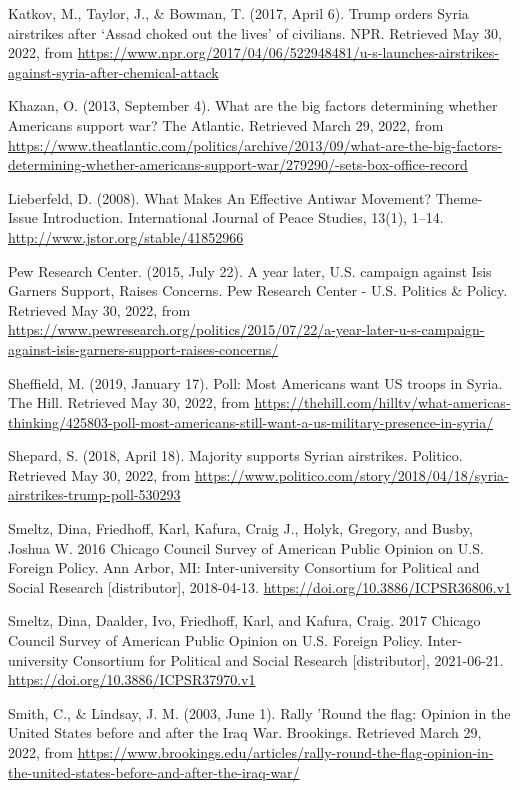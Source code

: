 \documentclass[
  11pt,
]{article}
\begin{document}
Katkov, M., Taylor, J., \& Bowman, T. (2017, April 6). Trump orders
Syria airstrikes after `Assad choked out the lives' of civilians. NPR.
Retrieved May 30, 2022, from
\url{https://www.npr.org/2017/04/06/522948481/u-s-launches-airstrikes-against-syria-after-chemical-attack}

Khazan, O. (2013, September 4). What are the big factors determining
whether Americans support war? The Atlantic. Retrieved March 29, 2022,
from
\url{https://www.theatlantic.com/politics/archive/2013/09/what-are-the-big-factors-determining-whether-americans-support-war/279290/-sets-box-office-record}

Lieberfeld, D. (2008). What Makes An Effective Antiwar Movement?
Theme-Issue Introduction. International Journal of Peace Studies, 13(1),
1--14. \url{http://www.jstor.org/stable/41852966}

Pew Research Center. (2015, July 22). A year later, U.S. campaign
against Isis Garners Support, Raises Concerns. Pew Research Center -
U.S. Politics \& Policy. Retrieved May 30, 2022, from
\url{https://www.pewresearch.org/politics/2015/07/22/a-year-later-u-s-campaign-against-isis-garners-support-raises-concerns/}

Sheffield, M. (2019, January 17). Poll: Most Americans want US troops in
Syria. The Hill. Retrieved May 30, 2022, from
\url{https://thehill.com/hilltv/what-americas-thinking/425803-poll-most-americans-still-want-a-us-military-presence-in-syria/}

Shepard, S. (2018, April 18). Majority supports Syrian airstrikes.
Politico. Retrieved May 30, 2022, from
\url{https://www.politico.com/story/2018/04/18/syria-airstrikes-trump-poll-530293}

Smeltz, Dina, Friedhoff, Karl, Kafura, Craig J., Holyk, Gregory, and
Busby, Joshua W. 2016 Chicago Council Survey of American Public Opinion
on U.S. Foreign Policy. Ann Arbor, MI: Inter-university Consortium for
Political and Social Research {[}distributor{]}, 2018-04-13.
\url{https://doi.org/10.3886/ICPSR36806.v1}

Smeltz, Dina, Daalder, Ivo, Friedhoff, Karl, and Kafura, Craig. 2017
Chicago Council Survey of American Public Opinion on U.S. Foreign
Policy. Inter-university Consortium for Political and Social Research
{[}distributor{]}, 2021-06-21.
\url{https://doi.org/10.3886/ICPSR37970.v1}

Smith, C., \& Lindsay, J. M. (2003, June 1). Rally 'Round the flag:
Opinion in the United States before and after the Iraq War. Brookings.
Retrieved March 29, 2022, from
\url{https://www.brookings.edu/articles/rally-round-the-flag-opinion-in-the-united-states-before-and-after-the-iraq-war/}
\end{document}
